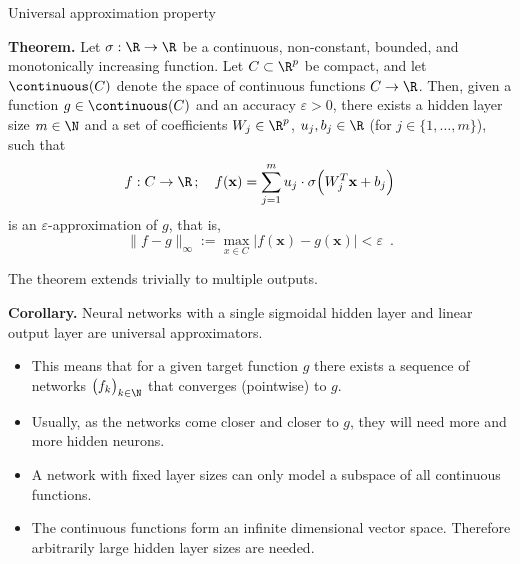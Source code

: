 \documentclass[11pt,compress,t,notes=noshow, xcolor=table]{beamer}
\begin{document}

\begin{vbframe}{Universal approximation property}

  \textbf{Theorem.}
  Let $\sigma : \R \to \R$ be a continuous, non-constant, bounded, and
  monotonically increasing function. Let $C \subset \R^p$ be compact,
  and let $\continuous(C)$ denote the space of continuous functions $C \to \R$.
  Then, given a function $g \in \continuous(C)$ and an accuracy $\varepsilon > 0$,
  there exists a hidden layer size $m \in \N$ and a set of coefficients
  $W_j \in \R^p$, $u_j, b_j \in \R$
  (for $j \in \{1, \dots, m\}$), such that
  $$
    f : C \to \R \,;\quad f(\mathbf{x}) = \sum_{j=1}^m u_j \cdot \sigma \Big( W_j^T \mathbf{x} + b_j \Big)
  $$
  is an $\varepsilon$-approximation of $g$, that is,
  $$
    \|f - g\|_{\infty} := \max_{x \in C} |f(\mathbf{x}) - g(\mathbf{x})| < \varepsilon
    \enspace.
  $$

  The theorem extends trivially to multiple outputs.

  \framebreak

  \textbf{Corollary.}
  Neural networks with a single sigmoidal hidden layer and linear
  output layer are universal approximators.

  \begin{itemize}
    \item This means that for a given target function $g$ there exists a
    sequence of networks $\big( f_k \big)_{k \in \N}$ that converges
    (pointwise) to $g$.%
    \vspace{2mm}
    \item Usually, as the networks come closer and closer to $g$, they
    will need more and more hidden neurons.
    \vspace{2mm}
    \item A network with fixed layer sizes can only model a subspace of all
    continuous functions. %
    \vspace{2mm}
    \item The continuous functions form an infinite dimensional vector space.
    Therefore arbitrarily large hidden layer sizes are needed.
  \end{itemize}


\end{vbframe}
\end{document}
